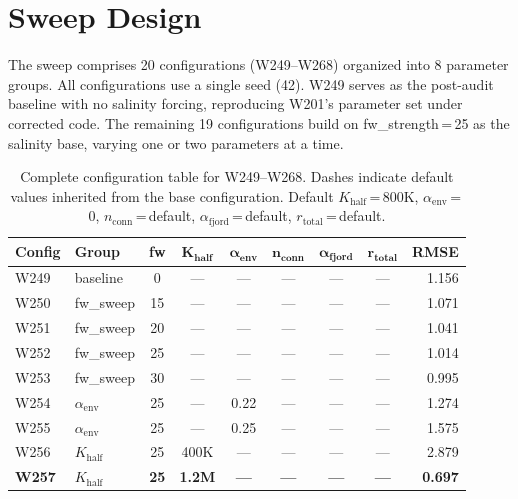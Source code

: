 \documentclass[11pt,a4paper]{article}
\begin{document}
\section{Sweep Design}

The sweep comprises 20 configurations (W249--W268) organized into 8 parameter groups. All configurations use a single seed (42). W249 serves as the post-audit baseline with no salinity forcing, reproducing W201's parameter set under corrected code. The remaining 19 configurations build on fw\_strength\,=\,25 as the salinity base, varying one or two parameters at a time.

\begin{table}[H]
\centering
\caption{Complete configuration table for W249--W268. Dashes indicate default values inherited from the base configuration. Default $K_{\text{half}}$\,=\,800K, $\alpha_{\text{env}}$\,=\,0, $n_{\text{conn}}$\,=\,default, $\alpha_{\text{fjord}}$\,=\,default, $r_{\text{total}}$\,=\,default.}
\label{tab:configs}
\small
\begin{tabular}{@{}llccccccr@{}}
\toprule
\textbf{Config} & \textbf{Group} & \textbf{fw} & $\boldsymbol{K_{\text{half}}}$ & $\boldsymbol{\alpha_{\text{env}}}$ & $\boldsymbol{n_{\text{conn}}}$ & $\boldsymbol{\alpha_{\text{fjord}}}$ & $\boldsymbol{r_{\text{total}}}$ & \textbf{RMSE} \\
\midrule
\rowcolor{lightgray}
W249 & baseline & 0 & --- & --- & --- & --- & --- & 1.156 \\
W250 & fw\_sweep & 15 & --- & --- & --- & --- & --- & 1.071 \\
\rowcolor{lightgray}
W251 & fw\_sweep & 20 & --- & --- & --- & --- & --- & 1.041 \\
W252 & fw\_sweep & 25 & --- & --- & --- & --- & --- & 1.014 \\
\rowcolor{lightgray}
W253 & fw\_sweep & 30 & --- & --- & --- & --- & --- & 0.995 \\
W254 & $\alpha_{\text{env}}$ & 25 & --- & 0.22 & --- & --- & --- & 1.274 \\
\rowcolor{lightgray}
W255 & $\alpha_{\text{env}}$ & 25 & --- & 0.25 & --- & --- & --- & 1.575 \\
W256 & $K_{\text{half}}$ & 25 & 400K & --- & --- & --- & --- & 2.879 \\
\rowcolor{lightgray}
\textcolor{bestgreen}{\textbf{W257}} & \textcolor{bestgreen}{\textbf{$K_{\text{half}}$}} & \textcolor{bestgreen}{\textbf{25}} & \textcolor{bestgreen}{\textbf{1.2M}} & \textcolor{bestgreen}{\textbf{---}} & \textcolor{bestgreen}{\textbf{---}} & \textcolor{bestgreen}{\textbf{---}} & \textcolor{bestgreen}{\textbf{---}} & \textcolor{bestgreen}{\textbf{0.697}} \\

\end{tabular}
\end{table}
\end{document}
